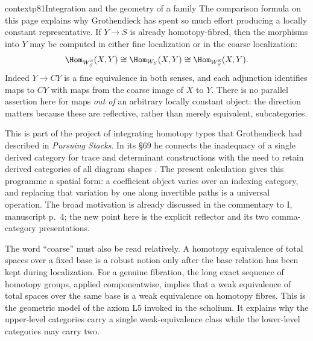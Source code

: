 \begin{dcomment}{context}{p81}{Integration and the geometry of a family}
The comparison formula on this page explains why Grothendieck has spent so much effort producing a locally constant representative. If $Y\to S$ is already homotopy-fibred, then the morphisms into $Y$ may be computed in either fine localization or in the coarse localization:
\[
 \Hom_{W_S^{\mathrm d}}(X,Y)\cong
 \Hom_{W_S}(X,Y)\cong
 \Hom_{W_S^{\mathrm g}}(X,Y).
\]
Indeed $Y\to CY$ is a fine equivalence in both senses, and each adjunction identifies maps to $CY$ with maps from the coarse image of $X$ to $Y$. There is no parallel assertion here for maps \emph{out of} an arbitrary locally constant object: the direction matters because these are reflective, rather than merely equivalent, subcategories.

This is part of the project of integrating homotopy types that Grothendieck had described in \emph{Pursuing Stacks}. In its \S69 he connects the inadequacy of a single derived category for trace and determinant constructions with the need to retain derived categories of all diagram shapes \citep{Grothendieck1983}. The present calculation gives this programme a spatial form: a coefficient object varies over an indexing category, and replacing that variation by one along invertible paths is a universal operation. The broad motivation is already discussed in the commentary to I, manuscript p.~4; the new point here is the explicit reflector and its two comma-category presentations.

The word ``coarse'' must also be read relatively. A homotopy equivalence of total spaces over a fixed base is a robust notion only after the base relation has been kept during localization. For a genuine fibration, the long exact sequence of homotopy groups, applied componentwise, implies that a weak equivalence of total spaces over the same base is a weak equivalence on homotopy fibres. This is the geometric model of the axiom L5 invoked in the scholium. It explains why the upper-level categories carry a single weak-equivalence class while the lower-level categories may carry two.


\end{dcomment}
